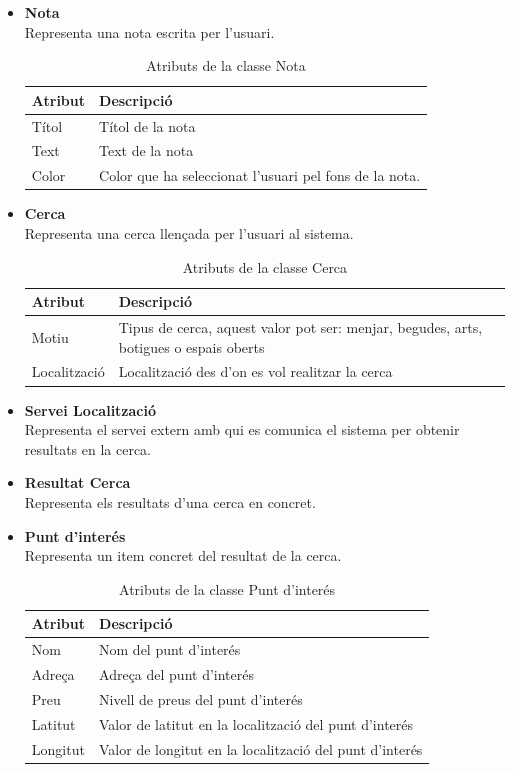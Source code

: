 \begin{itemize}
\item[]\textbf{Nota}\\
Representa una nota escrita per l'usuari.

\begin{table}[!h]
\centering
\begin{tabular}{|M|T|}
\hline
\textbf{Atribut}  & \textbf{Descripció} \\\hline
Títol & Títol de la nota\\\hline
Text &  Text de la nota\\\hline
Color & Color que ha seleccionat l'usuari pel fons de la nota.\\\hline
\end{tabular}
\label{}
\caption{Atributs de la classe Nota}
\end{table}

\item[]\textbf{Cerca}\\
Representa una cerca llençada per l'usuari al sistema.

\begin{table}[!h]
\centering
\begin{tabular}{|M|T|}
\hline
\textbf{Atribut}  & \textbf{Descripció} \\\hline
Motiu & Tipus de cerca, aquest valor pot ser: menjar, begudes, arts, botigues o espais oberts\\\hline
Localització &  Localització des d'on es vol realitzar la cerca\\\hline
\end{tabular}
\label{}
\caption{Atributs de la classe Cerca}
\end{table}


\item[]\textbf{Servei Localització}\\
Representa el servei extern amb qui es comunica el sistema per obtenir resultats en la cerca.


\item[]\textbf{Resultat Cerca}\\
Representa els resultats d'una cerca en concret.

\item[]\textbf{Punt d'interés}\\
Representa un item concret del resultat de la cerca.

\begin{table}[!h]
\centering
\begin{tabular}{|M|T|}
\hline
\textbf{Atribut}  & \textbf{Descripció} \\\hline
Nom & Nom del punt d'interés\\\hline
Adreça &  Adreça del punt d'interés\\\hline
Preu & Nivell de preus del punt d'interés\\\hline
Latitut & Valor de latitut en la localització del punt d'interés\\\hline
Longitut & Valor de longitut en la localització del punt d'interés\\\hline
\end{tabular}
\label{}
\caption{Atributs de la classe Punt d'interés}
\end{table}



\end{itemize}

